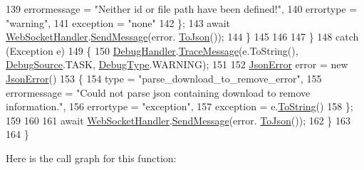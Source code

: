 \begin{DoxyCode}
139                         errormessage = \textcolor{stringliteral}{"Neither id or file path have been defined!"},
140                         errortype = \textcolor{stringliteral}{"warning"},
141                         exception = \textcolor{stringliteral}{"none"}
142                     \};
143                     await \mbox{\hyperlink{class_little_weeb_library_1_1_handlers_1_1_web_socket_handler}{WebSocketHandler}}.\mbox{\hyperlink{class_little_weeb_library_1_1_handlers_1_1_web_socket_handler_a1de289d54d665a32c93478c68d3e6ad0}{SendMessage}}(error.
      \mbox{\hyperlink{class_little_weeb_library_1_1_models_1_1_json_error_a0e3e7dd2e2990404b7f0461742b23440}{ToJson}}());
144                 \}
145 
146 
147             \}
148             \textcolor{keywordflow}{catch} (Exception e)
149             \{
150                 \mbox{\hyperlink{class_little_weeb_library_1_1_handlers_1_1_debug_handler}{DebugHandler}}.\mbox{\hyperlink{class_little_weeb_library_1_1_handlers_1_1_debug_handler_afccb37dfd6b2114af72000c2f4fe4607}{TraceMessage}}(e.ToString(), 
      \mbox{\hyperlink{namespace_little_weeb_library_1_1_handlers_a2a6ca0775121c9c503d58aa254d292be}{DebugSource}}.TASK, \mbox{\hyperlink{namespace_little_weeb_library_1_1_handlers_ab66019ed40462876ec4e61bb3ccb0a62}{DebugType}}.WARNING);
151 
152                 \mbox{\hyperlink{class_little_weeb_library_1_1_models_1_1_json_error}{JsonError}} error = \textcolor{keyword}{new} \mbox{\hyperlink{class_little_weeb_library_1_1_models_1_1_json_error}{JsonError}}()
153                 \{
154                     type = \textcolor{stringliteral}{"parse\_download\_to\_remove\_error"},
155                     errormessage = \textcolor{stringliteral}{"Could not parse json containing download to remove information."},
156                     errortype = \textcolor{stringliteral}{"exception"},
157                     exception = e.\mbox{\hyperlink{class_little_weeb_library_1_1_models_1_1_json_error_ad7d5522c90119111d2e929f39e7f6d3c}{ToString}}()
158                 \};
159 
160 
161                 await \mbox{\hyperlink{class_little_weeb_library_1_1_handlers_1_1_web_socket_handler}{WebSocketHandler}}.\mbox{\hyperlink{class_little_weeb_library_1_1_handlers_1_1_web_socket_handler_a1de289d54d665a32c93478c68d3e6ad0}{SendMessage}}(error.
      \mbox{\hyperlink{class_little_weeb_library_1_1_models_1_1_json_error_a0e3e7dd2e2990404b7f0461742b23440}{ToJson}}());
162             \}
163 
164         \}
\end{DoxyCode}
Here is the call graph for this function\+:\nopagebreak
